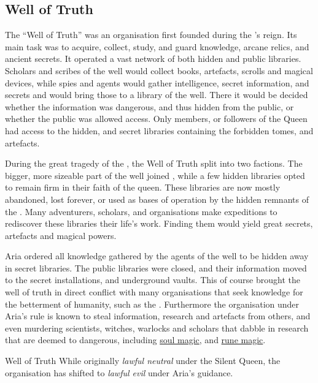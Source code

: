 \subsection{Well of Truth}
\label{sec:Well of Truth}

The ``Well of Truth'' was an organisation first founded during the
's reign. Its main task was to acquire, collect,
study, and guard knowledge, arcane relics, and ancient secrets. It operated a
vast network of both hidden and public libraries. Scholars and scribes of the
well would collect books, artefacts, scrolls and magical devices, while spies
and agents would gather intelligence, secret information, and secrets and
would bring those to a library of the well. There it would be decided whether
the information was dangerous, and thus hidden from the public, or whether the
public was allowed access. Only members, or followers of the Queen had access
to the hidden, and secret libraries containing the forbidden tomes, and
artefacts.

During the great tragedy of the , the Well of Truth
split into two factions. The bigger, more sizeable part of the well joined
, while a few hidden libraries opted to remain firm in their
faith of the queen. These libraries are now mostly abandoned, lost forever, or
used as bases of operation by the hidden remnants of the . Many adventurers, scholars, and organisations make expeditions
to rediscover these libraries their life's work. Finding them would yield
great secrets, artefacts and magical powers.

Aria ordered all knowledge gathered by the agents of the well to be hidden
away in secret libraries. The public libraries were closed, and their
information moved to the secret installations, and underground vaults. This
of course brought the well of truth in direct conflict with many organisations
that seek knowledge for the betterment of humanity, such as the
. Furthermore the organisation under Aria's rule is
known to steal information, research and artefacts from others, and even
murdering scientists, witches, warlocks and scholars that dabble in research
that are deemed to dangerous, including \hyperref[sec:Soul Magic]{soul magic},
and \hyperref[sec:Rune Magic]{rune magic}.


\begin{35e}{Well of Truth}
  While originally \emph{lawful neutral} under the Silent Queen, the
  organisation has shifted to \emph{lawful evil} under Aria's guidance.
\end{35e}

